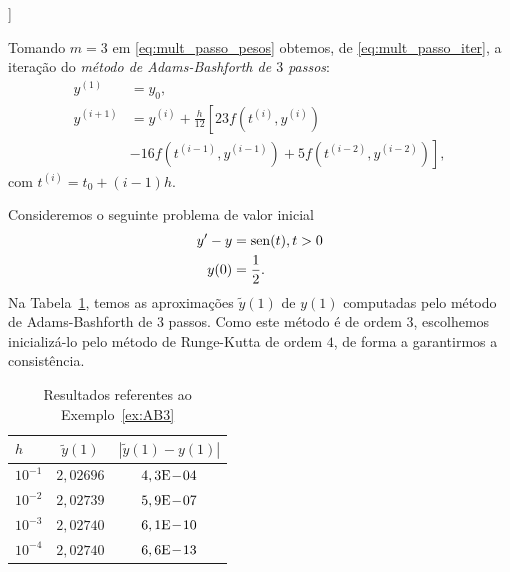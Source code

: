 \begin{flushleft}
  [[tag:revisar]]
\end{flushleft}

Tomando $m=3$ em \eqref{eq:mult_passo_pesos} obtemos, de \eqref{eq:mult_passo_iter}, a iteração do \emph{método de Adams-Bashforth de $3$ passos}:
\begin{align}
  y^{(1)} &= y_0,\\
  y^{(i+1)} &= y^{(i)} + \frac{h}{12}\left[23f(t^{(i)},y^{(i)}) \right.\nonumber\\
              &\left. - 16f(t^{(i-1)},y^{(i-1)}) + 5f(t^{(i-2)},y^{(i-2)})\right],
\end{align}
com $t^{(i)} = t_0 + (i-1)h$.

\begin{ex}\label{ex:AB3}
  Consideremos o seguinte problema de valor inicial
  \begin{align}
    y' - y &= \operatorname{sen}(t), t>0\\
    y(0) &= \frac{1}{2}.
  \end{align}
  Na Tabela~\ref{tab:ex_AB3}, temos as aproximações $\tilde{y}(1)$ de $y(1)$ computadas pelo método de Adams-Bashforth de $3$ passos. Como este método é de ordem $3$, escolhemos inicializá-lo pelo método de Runge-Kutta de ordem $4$, de forma a garantirmos a consistência.
 
  \begin{table}[h!]
    \centering
    \begin{tabular}{l|cc}
      $h$ & $\tilde{y}(1)$ & $|\tilde{y}(1)-y(1)|$\\\hline
      $10^{-1}$ & $2,02696$ & $4,3\mathrm{E}\!-\!04$ \\
      $10^{-2}$ & $2,02739$ & $5,9\mathrm{E}\!-\!07$ \\
      $10^{-3}$ & $2,02740$ & $6,1\mathrm{E}\!-\!10$ \\
      $10^{-4}$ & $2,02740$ & $6,6\mathrm{E}\!-\!13$ \\\hline
   \end{tabular}
    \caption{Resultados referentes ao Exemplo~\ref{ex:AB3}}
    \label{tab:ex_AB3}
  \end{table}






\end{ex}

